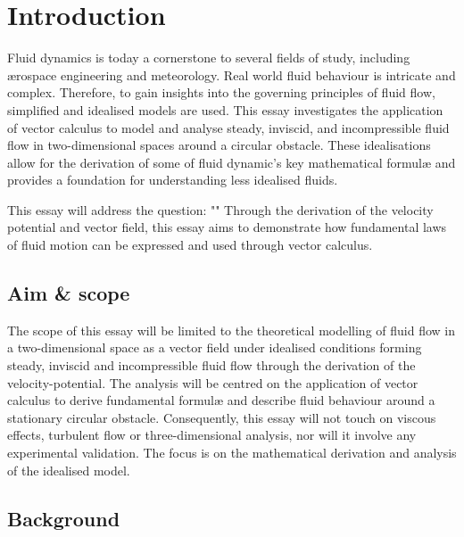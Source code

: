 \section{Introduction}
Fluid dynamics is today a cornerstone to several fields of study, including ærospace engineering and meteorology.
Real world fluid behaviour is intricate and complex. Therefore, to gain insights into the governing principles of
fluid flow, simplified and idealised models are used. This essay investigates the application of vector calculus
to model and analyse steady, inviscid, and incompressible fluid flow in two-dimensional spaces around a circular
obstacle. These idealisations allow for the derivation of some of fluid dynamic's key mathematical formulæ and
provides a foundation for understanding less idealised fluids.

This essay will address the question: "\researchquestion" Through the derivation of the velocity potential and
vector field, this essay aims to demonstrate how fundamental laws of fluid motion can be expressed and used through
vector calculus.

\subsection{Aim \& scope}
The scope of this essay will be limited to the theoretical modelling of fluid flow in a two-dimensional space
as a vector field under idealised conditions forming steady, inviscid and incompressible fluid flow through the 
derivation of the velocity-potential. The analysis will be centred on the application of vector calculus to derive
fundamental formulæ and describe fluid behaviour around a stationary circular obstacle. Consequently, this essay
will not touch on viscous effects, turbulent flow or three-dimensional analysis, nor will it involve any experimental 
validation. The focus is on the mathematical derivation and analysis of the idealised model.

\subsection{Background}
